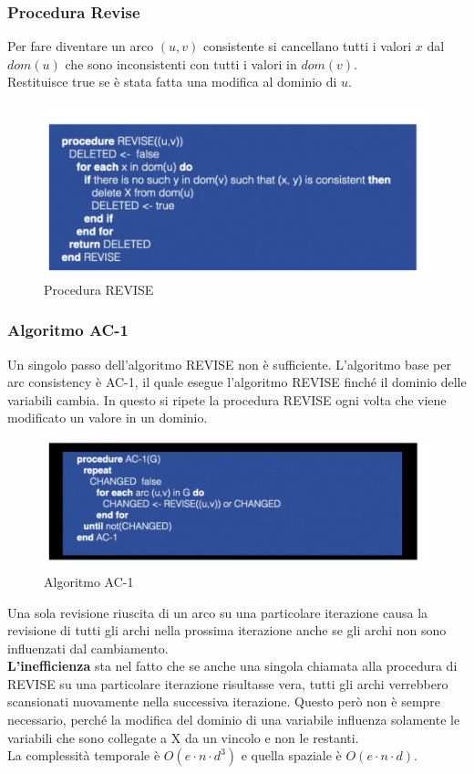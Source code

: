 \subsubsection{Procedura Revise}
Per fare diventare un arco $(u,v)$ consistente si cancellano tutti i valori $x$ dal
$dom(u)$ che sono inconsistenti con tutti i valori in $dom(v)$. \\Restituisce true se
è stata fatta una modifica al dominio di $u$.
\begin{figure}[H]
    \centering
    \includegraphics[width=13cm, keepaspectratio]{img/Cap3/revise.png}
    \caption{Procedura REVISE}
\end{figure}

\subsubsection{Algoritmo AC-1}
Un singolo passo dell'algoritmo REVISE non è sufficiente. L'algoritmo base per
arc consistency è AC-1, il quale esegue l'algoritmo REVISE finché il dominio
delle variabili cambia. In questo si ripete la procedura REVISE ogni volta che
viene modificato un valore in un dominio.

\begin{figure}[H]
    \centering
    \includegraphics[width=13cm, keepaspectratio]{img/Cap3/ac-1.png}
    \caption{Algoritmo AC-1}
\end{figure}

Una sola revisione riuscita di un arco su una particolare iterazione causa la
revisione di tutti gli archi nella prossima iterazione anche se gli archi non
sono influenzati dal cambiamento.\\
\textbf{L'inefficienza} sta nel fatto che se anche una singola chiamata alla
procedura di REVISE su una particolare iterazione risultasse vera, tutti gli
archi verrebbero scansionati nuovamente nella successiva iterazione. Questo però
non è sempre necessario, perché la modifica del dominio di una variabile
influenza solamente le variabili che sono collegate a X da un vincolo e non le
restanti.\\
La complessità temporale è $O(e \cdot n \cdot d^3)$ e quella spaziale è $O(e \cdot n \cdot d)$.

